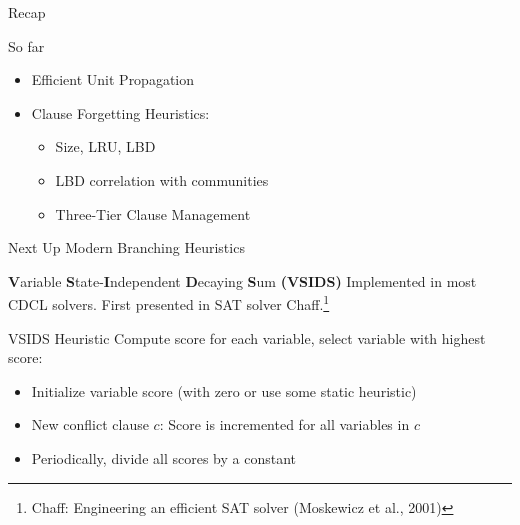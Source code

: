 \documentclass[t]{sdqbeamer}
\begin{document}

\begin{frame}{Recap}
\begin{block}{So far}
\begin{itemize}
    \item Efficient Unit Propagation
    \item Clause Forgetting Heuristics:
    \begin{itemize}
        \item Size, LRU, LBD
        \item LBD correlation with communities
        \item Three-Tier Clause Management
    \end{itemize}
\end{itemize}
\end{block}
\begin{block}{Next Up}
Modern Branching Heuristics
\end{block}
\end{frame}

    
\begin{frame}{{\bf V}ariable {\bf S}tate-{\bf I}ndependent {\bf D}ecaying {\bf S}um {\bf (VSIDS)}}
    Implemented in most CDCL solvers.
    First presented in SAT solver Chaff.\footnote{Chaff: Engineering an efficient SAT solver (Moskewicz et al., 2001)}
    \begin{block}{VSIDS Heuristic}
    Compute score for each variable, select variable with highest score:\\[1em]
    \begin{itemize}\setlength{\itemsep}{1em}
        \item Initialize variable score (with zero or use some static heuristic)
        \item New conflict clause $c$: Score is incremented for all variables in $c$
        \item Periodically, divide all scores by a constant
    \end{itemize}	
    \end{block}
    \end{frame}
    
\end{document}
